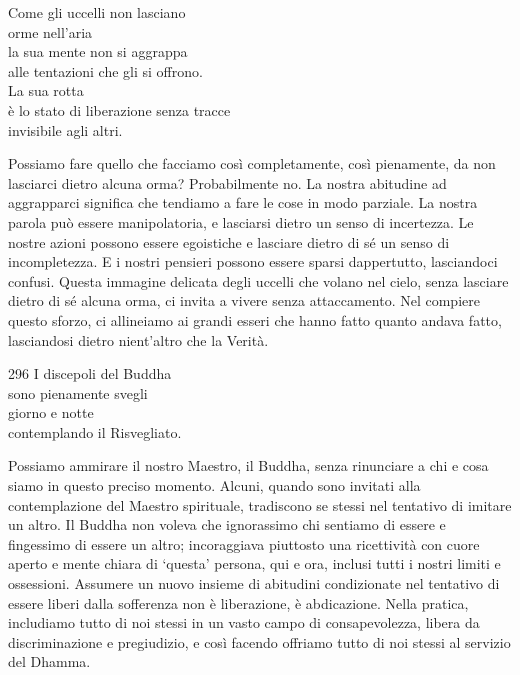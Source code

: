 
\begin{dhpVerse}{92}
\label{dhp-92}
Come gli uccelli non lasciano\\
orme nell'aria\\
la sua mente non si aggrappa\\
alle tentazioni che gli si offrono.\\
La sua rotta\\
è lo stato di liberazione senza tracce\\
invisibile agli altri.
\end{dhpVerse}

\begin{dhpRefl}
  Possiamo fare quello che facciamo così completamente, così pienamente, da non
  lasciarci dietro alcuna orma? Probabilmente no. La nostra abitudine ad
  aggrapparci significa che tendiamo a fare le cose in modo parziale. La nostra
  parola può essere manipolatoria, e lasciarsi dietro un senso di incertezza. Le
  nostre azioni possono essere egoistiche e lasciare dietro di sé un senso di
  incompletezza. E i nostri pensieri possono essere sparsi dappertutto,
  lasciandoci confusi. Questa immagine delicata degli uccelli che volano nel
  cielo, senza lasciare dietro di sé alcuna orma, ci invita a vivere senza
  attaccamento. Nel compiere questo sforzo, ci allineiamo ai grandi esseri che
  hanno fatto quanto andava fatto, lasciandosi dietro nient'altro che la Verità.
\end{dhpRefl}


\begin{dhpVerse}{296}
\label{dhp-296}
I discepoli del Buddha\\
sono pienamente svegli\\
giorno e notte\\
contemplando il Risvegliato.
\end{dhpVerse}

\begin{dhpRefl}
  Possiamo ammirare il nostro Maestro, il Buddha, senza rinunciare a chi e cosa
  siamo in questo preciso momento. Alcuni, quando sono invitati alla
  contemplazione del Maestro spirituale, tradiscono se stessi nel tentativo di
  imitare un altro. Il Buddha non voleva che ignorassimo chi sentiamo di essere
  e fingessimo di essere un altro; incoraggiava piuttosto una ricettività con
  cuore aperto e mente chiara di `questa' persona, qui e ora, inclusi tutti i
  nostri limiti e ossessioni. Assumere un nuovo insieme di abitudini
  condizionate nel tentativo di essere liberi dalla sofferenza non è
  liberazione, è abdicazione. Nella pratica, includiamo tutto di noi stessi in
  un vasto campo di consapevolezza, libera da discriminazione e pregiudizio, e
  così facendo offriamo tutto di noi stessi al servizio del Dhamma.
\end{dhpRefl}

